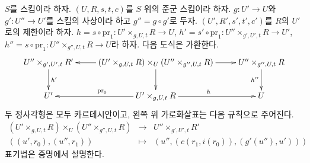 \begin{lemma}
\label{lemma-double-restrict}
$S$를 스킴이라 하자.
$(U, R, s, t, c)$를 $S$ 위의 준군 스킴이라 하자.
$g : U' \to U$와 $g' : U'' \to U'$를 스킴의 사상이라 하고
$g'' = g \circ g'$로 두자.
$(U', R', s', t', c')$를 $R$의 $U'$로의 제한이라 하자.
$h = s \circ \text{pr}_1 : U' \times_{g, U, t} R \to U$,
$h' = s' \circ \text{pr}_1 : U'' \times_{g', U', t} R \to U'$,
$h'' = s \circ \text{pr}_1 : U'' \times_{g'', U, t} R \to U$라 하자.
다음 도식은 가환한다.
$$
\xymatrix{
U'' \times_{g', U', t} R' \ar[d]^{h'} &
(U' \times_{g, U, t} R) \times_U (U'' \times_{g'', U, t} R)
\ar[l] \ar[r] \ar[d] &
U'' \times_{g'', U, t} R \ar[d]_{h''} \\
U' &
U' \times_{g, U, t} R \ar[l]_{\text{pr}_0} \ar[r]^h &
U
}
$$
두 정사각형은 모두 카르테시안이고, 왼쪽 위 가로화살표는 다음 규칙으로
주어진다.
$$
\begin{matrix}
(U' \times_{g, U, t} R) \times_U (U'' \times_{g'', U, t} R) &
\longrightarrow &
U'' \times_{g', U', t} R' \\
((u', r_0), (u'', r_1)) &
\longmapsto &
(u'', (c(r_1, i(r_0)), (g'(u''), u')))
\end{matrix}
$$
표기법은 증명에서 설명한다.
\end{lemma}

